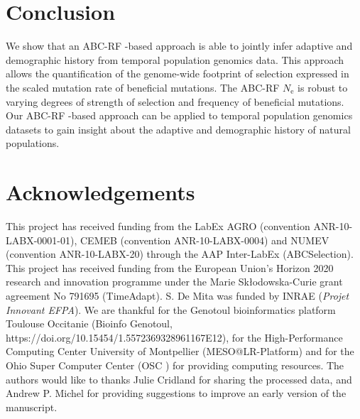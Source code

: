 \documentclass[a4paper, 12pt]{article}
\begin{document}
\section*{Conclusion}

We show that an ABC-RF -based approach is able to jointly infer adaptive and demographic history from temporal population genomics data. This approach allows the quantification of the genome-wide footprint of selection expressed in the scaled mutation rate of beneficial mutations. The ABC-RF $N_{\mathrm{e}}$ is robust to varying degrees of strength of selection and frequency of beneficial mutations. Our ABC-RF -based approach can be applied to temporal population genomics datasets to gain insight about the adaptive and demographic history of natural populations.

\section*{Acknowledgements}

This project has received funding from the LabEx AGRO (convention ANR-10-LABX-0001-01), CEMEB (convention ANR-10-LABX-0004) and NUMEV (convention ANR-10-LABX-20) through the AAP Inter-LabEx (ABCSelection). This project has received funding from the European Union's Horizon 2020 research and innovation programme under the Marie Skłodowska-Curie grant agreement No 791695 (TimeAdapt). S. De Mita was funded by INRAE (\textit{Projet Innovant EFPA}). We are thankful for the Genotoul bioinformatics platform Toulouse Occitanie (Bioinfo Genotoul, https://doi.org/10.15454/1.5572369328961167E12), for the High-Performance Computing Center University of Montpellier (MESO@LR-Platform) and for the Ohio Super Computer Center (OSC \citet{OhioSupercomputerCenter1987}) for providing computing resources. The authors would like to thanks Julie Cridland for sharing the processed data, and Andrew P. Michel for providing suggestions to improve an early version of the manuscript. 



\end{document}
